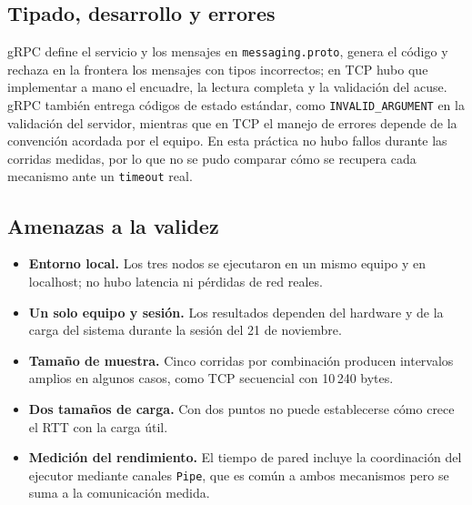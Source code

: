 \subsection{Tipado, desarrollo y errores}

gRPC define el servicio y los mensajes en \texttt{messaging.proto}, genera el
código y rechaza en la frontera los mensajes con tipos incorrectos; en TCP hubo
que implementar a mano el encuadre, la lectura completa y la validación del acuse.
gRPC también entrega códigos de estado estándar, como \texttt{INVALID\_ARGUMENT}
en la validación del servidor, mientras que en TCP el manejo de errores depende de
la convención acordada por el equipo. En esta práctica no hubo fallos durante las
corridas medidas, por lo que no se pudo comparar cómo se recupera cada mecanismo
ante un \texttt{timeout} real.

\subsection{Amenazas a la validez}

\begin{itemize}
  \item \textbf{Entorno local.} Los tres nodos se ejecutaron en un mismo equipo y
        en localhost; no hubo latencia ni pérdidas de red reales.
  \item \textbf{Un solo equipo y sesión.} Los resultados dependen del hardware y de
        la carga del sistema durante la sesión del 21 de noviembre.
  \item \textbf{Tamaño de muestra.} Cinco corridas por combinación producen
        intervalos amplios en algunos casos, como TCP secuencial con 10\,240 bytes.
  \item \textbf{Dos tamaños de carga.} Con dos puntos no puede establecerse cómo
        crece el RTT con la carga útil.
  \item \textbf{Medición del rendimiento.} El tiempo de pared incluye la
        coordinación del ejecutor mediante canales \texttt{Pipe}, que es común a
        ambos mecanismos pero se suma a la comunicación medida.
\end{itemize}
